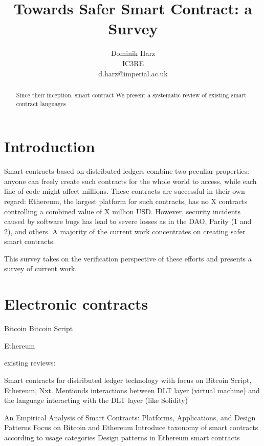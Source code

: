 \documentclass{article}
\title{Towards Safer Smart Contract: a Survey}
\date{}
\author{Dominik Harz \\
IC3RE\\
d.harz@imperial.ac.uk}
\begin{document}
\maketitle

\begin{abstract}
Since their inception, smart contract
We present a systematic review of existing smart contract languages
\end{abstract}

\section{Introduction}
Smart contracts based on distributed ledgers combine two peculiar properties: anyone can freely create such contracts for the whole world to access, while each line of code might affect millions.
These contracts are successful in their own regard:
Ethereum, the largest platform for such contracts, has no X contracts controlling a combined value of X million USD.
However, security incidents caused by software bugs has lead to severe losses as in the DAO, Parity (1 and 2), and others.
A majority of the current work concentrates on creating safer smart contracts.


This survey takes on the verification perspective of these efforts and presents a survey of current work.

\section{}

\section{Electronic contracts}

Bitcoin \cite{Nakamoto2008}
Bitcoin Script \cite{BitcoinWiki2018Script}

Ethereum \cite{Buterin2013,Wood2014}

existing reviews:

Smart contracts for distributed ledger technology with focus on Bitcoin Script, Ethereum, Nxt. Mentionds interactions between DLT layer (virtual machine) and the language interacting with the DLT layer (like Solidity)
\cite{Seijas2017}


An Empirical Analysis of Smart Contracts: Platforms, Applications, and Design Patterns
Focus on Bitcoin and Ethereum
Introduce taxonomy of smart contracts according to usage categories
Design patterns in Ethereum smart contracts
\cite{Bartoletti2017}
\end{document}

